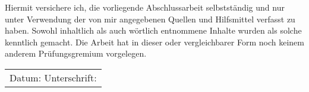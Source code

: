 \label{erklaerung}

Hiermit versichere ich, die vorliegende Abschlussarbeit selbstständig und nur unter Verwendung der von mir angegebenen Quellen und Hilfsmittel verfasst zu haben. Sowohl inhaltlich als auch wörtlich entnommene Inhalte wurden als solche kenntlich gemacht. Die Arbeit hat in dieser oder vergleichbarer Form noch keinem anderem Prüfungsgremium vorgelegen.

\begin{center}
\begin{tabular}{p{410pt}}
\\[1.5cm]
Datum: \hrulefill\enspace Unterschrift: \hrulefill
\\[3.5cm]
\end{tabular}
\end{center}